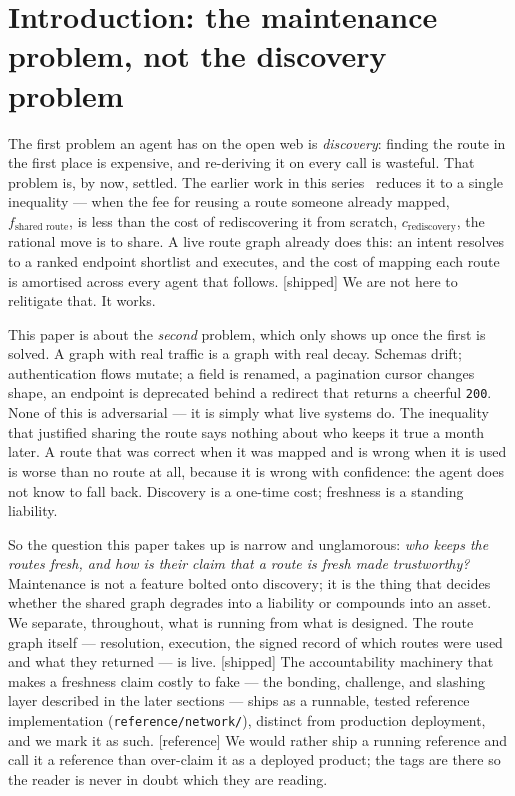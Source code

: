 \documentclass[11pt]{article}
\newcommand{\impl}{\textcolor{green!55!black}{\small[shipped]}}
\newcommand{\refimpl}{\textcolor{blue!70!black}{\small[reference]}}
\begin{document}
\section{Introduction: the maintenance problem, not the discovery problem}

The first problem an agent has on the open web is \emph{discovery}: finding the
route in the first place is expensive, and re-deriving it on every call is
wasteful. That problem is, by now, settled. The earlier work in this
series~\cite{internalapis} reduces it to a single inequality --- when the fee for
reusing a route someone already mapped, $f_{\text{shared route}}$, is less than
the cost of rediscovering it from scratch, $c_{\text{rediscovery}}$, the rational
move is to share. A live route graph already does this: an intent resolves to a
ranked endpoint shortlist and executes, and the cost of mapping each route is
amortised across every agent that follows. \impl{} We are not here to relitigate
that. It works.

This paper is about the \emph{second} problem, which only shows up once the first
is solved. A graph with real traffic is a graph with real decay. Schemas drift;
authentication flows mutate; a field is renamed, a pagination cursor changes
shape, an endpoint is deprecated behind a redirect that returns a cheerful
\texttt{200}. None of this is adversarial --- it is simply what live systems do.
The inequality that justified sharing the route says nothing about who keeps it
true a month later. A route that was correct when it was mapped and is wrong when
it is used is worse than no route at all, because it is wrong with confidence: the
agent does not know to fall back. Discovery is a one-time cost; freshness is a
standing liability.

So the question this paper takes up is narrow and unglamorous: \emph{who keeps the
routes fresh, and how is their claim that a route is fresh made trustworthy?}
Maintenance is not a feature bolted onto discovery; it is the thing that decides
whether the shared graph degrades into a liability or compounds into an asset. We
separate, throughout, what is running from what is designed. The route graph
itself --- resolution, execution, the signed record of which routes were used and
what they returned --- is live. \impl{} The accountability machinery that makes a
freshness claim costly to fake --- the bonding, challenge, and slashing layer
described in the later sections --- ships as a runnable, tested reference
implementation (\texttt{reference/network/}), distinct from production deployment,
and we mark it as such. \refimpl{} We would rather ship a running reference and call
it a reference than over-claim it as a deployed product; the tags are there so the
reader is never in doubt which they are reading.
\end{document}
